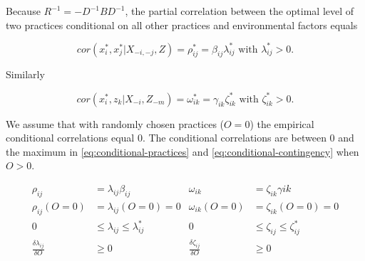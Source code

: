 \documentclass[12pt]{article}
\begin{document}
Because $R^{-1} = - D^{-1}BD^{-1}$, the partial correlation between the optimal level of two practices conditional on all other practices and environmental factors equals 

\begin{equation}\label{eq:conditional-practices}
cor(x_i^*, x_j^* | X_{-i, -j}, Z)  = \rho^*_{ij} = \beta_{ij}\lambda_{ij}^* \text{ with } \lambda_{ij}^* > 0. 
\end{equation}

Similarly

\begin{equation}\label{eq:conditional-contingency}
cor(x_i^*, z_k | X_{-i}, Z_{-m})  = \omega^*_{ik} = \gamma_{ik}\zeta_{ik}^* \text{ with } \zeta_{ik}^* > 0. 
\end{equation}
 
We assume that with randomly chosen practices ($O = 0$) the empirical conditional correlations equal $0$. The conditional correlations are between $0$ and the maximum in \eqref{eq:conditional-practices} and \eqref{eq:conditional-contingency} when $O > 0$.

\begin{align*}
\rho_{ij} &= \lambda_{ij} \beta_{ij}
& \omega_{ik} &= \zeta_{ik} \gamma{ik} \\
\rho_{ij}(O = 0) &= \lambda_{ij}(O = 0) = 0 
& \omega_{ik}(O = 0) &= \zeta_{ik}(O = 0) = 0 \\
0 & \leq \lambda_{ij} \leq \lambda^*_{ij}
& 0 & \leq \zeta_{ij} \leq \zeta^*_{ij} \\
\frac{\delta \lambda_{ij}}{\delta O} & \geq 0 
& \frac{\delta \zeta_{ij}}{\delta O} & \geq 0 
\end{align*}
 
% 
 
\end{document}
